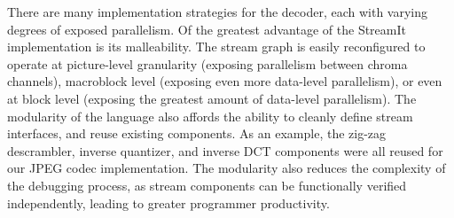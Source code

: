 There are many implementation strategies for the decoder, each with
varying degrees of exposed parallelism. Of the greatest advantage of
the StreamIt implementation is its malleability. The stream graph is
easily reconfigured to operate at picture-level granularity (exposing
parallelism between chroma channels), macroblock level (exposing even
more data-level parallelism), or even at block level (exposing the
greatest amount of data-level parallelism). The modularity of the
language also affords the ability to cleanly define stream interfaces,
and reuse existing components. As an example, the zig-zag descrambler,
inverse quantizer, and inverse DCT components were all reused for our
JPEG codec implementation. The modularity also reduces the complexity
of the debugging process, as stream components can be functionally
verified independently, leading to greater programmer productivity.



